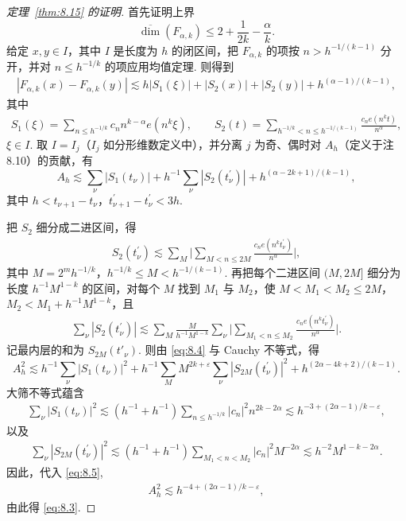 \begin{proof}[定理~\ref{thm:8.15} 的证明]
首先证明上界
\begin{equation}\label{eq:8.3}
  \overline{\dim}(F_{\alpha,k})\leq 2+\frac{1}{2k}-\frac{\alpha}{k}.
\end{equation}
给定 $x, y \in I$，其中 $I$ 是长度为 $h$ 的闭区间，把 $F_{\alpha, k}$ 的项按 $n > h^{-1/(k-1)}$ 分开，并对 $n \leq h^{-1/k}$ 的项应用均值定理. 则得到
\begin{align*}
  |F_{\alpha,k}(x)-F_{\alpha,k}(y)|
  \lesssim h\left|S_{1}(\xi)\right|+|S_{2}(x)|+|S_{2}(y)|+h^{(\alpha-1)/(k-1)},
\end{align*}
其中
\begin{align*}
  S_{1}(\xi)=\sum_{n\leq h^{-1/k}}c_{n}n^{k-\alpha}e(n^{k}\xi),\qquad
  S_{2}(t)=\sum_{h^{-1/k}<n\leq h^{-1/(k-1)}}\frac{c_{n}e(n^{k}t)}{n^{\alpha}},
\end{align*}
$\xi \in I$. 取 $I = I_j$（$I_j$ 如分形维数定义中），并分离 $j$ 为奇、偶时对 $A_h$（定义于注 8.10）的贡献，有
\begin{equation}\label{eq:8.4}
  A_{h}\lesssim\sum_{\nu}\left|S_{1}(t_{\nu})\right|
  +h^{-1}\sum_{\nu}\left|S_{2}(t_{\nu}^{\prime})\right|
  +h^{(\alpha-2k+1)/(k-1)},
\end{equation}
其中 $h < t_{\nu+1} - t_{\nu}$，$t_{\nu+1}^{\prime} - t_{\nu}^{\prime} < 3h$.

把 $S_{2}$ 细分成二进区间，得
\begin{align*}
  S_{2}(t_{\nu}^{\prime})\lesssim\sum_{M}\Big|\sum_{M<n\leq 2M}\frac{c_{n}e(n^{k}t_{\nu}^{\prime})}{n^{\alpha}}\Big|,
\end{align*}
其中 $M = 2^m h^{-1/k}$，$h^{-1/k} \leq M < h^{-1/(k-1)}$. 再把每个二进区间 $(M, 2M]$ 细分为长度 $h^{-1}M^{1-k}$ 的区间，对每个 $M$ 找到 $M_1$ 与 $M_2$，使 $M < M_1 < M_2 \leq 2M$，$M_2 < M_1 + h^{-1}M^{1-k}$，且
\begin{align*}
  \sum_{\nu}|S_{2}(t_{\nu}^{\prime})|
  \lesssim\sum_{M}\frac{M}{h^{-1}M^{1-k}}\sum_{\nu}
  \Big|\sum_{M_{1}<n\leq M_{2}}\frac{c_{n}e(n^{k}t_{\nu}^{\prime})}{n^{\alpha}}\Big|.
\end{align*}
记最内层的和为 $S_{2M}(t'_\nu)$. 则由 \eqref{eq:8.4} 与 Cauchy 不等式，得
\begin{equation}\label{eq:8.5}
  A_{h}^{2}\lesssim h^{-1}\sum_{\nu}|S_{1}(t_{\nu})|^{2}
  +h^{-1}\sum_{M}M^{2k+\varepsilon}\sum_{\nu}|S_{2M}(t_{\nu}^{\prime})|^{2}
  +h^{(2\alpha-4k+2)/(k-1)}.
\end{equation}
大筛不等式蕴含
\begin{align*}
  \sum_{\nu}|S_{1}(t_{\nu})|^{2}
  \lesssim(h^{-1}+h^{-1})\sum_{n\leq h^{-1/k}}|c_{n}|^{2}n^{2k-2\alpha}
  \lesssim h^{-3+(2\alpha-1)/k-\varepsilon},
\end{align*}
以及
\begin{align*}
  \sum_{\nu}|S_{2M}(t_{\nu}^{\prime})|^{2}
  \lesssim(h^{-1}+h^{-1})\sum_{M_{1}<n<M_{2}}|c_{n}|^{2}M^{-2\alpha}
  \lesssim h^{-2}M^{1-k-2\alpha}.
\end{align*}
因此，代入 \eqref{eq:8.5},
\begin{align*}
  A_{h}^{2}\lesssim h^{-4+(2\alpha-1)/k-\varepsilon},
\end{align*}
由此得 \eqref{eq:8.3}.


\end{proof}
